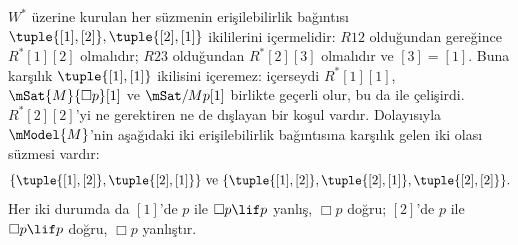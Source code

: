 \begin{ex}
  $W^*$ üzerine kurulan her süzmenin erişilebilirlik bağıntısı
  $\tuple{[1], [2]}, \tuple{[2],[1]}$ ikililerini içermelidir:
  $R12$ olduğundan
   gereğince
  $R^*[1][2]$ olmalıdır; $R23$ olduğundan $R^*[2][3]$ olmalıdır ve
  $[3]=[1]$. Buna karşılık $\tuple{[1],[1]}$ ikilisini içeremez: içerseydi
  $R^*[1][1]$, $\mSat{M}{\Box p}[1]$ ve $\mSat/{M}{p}[1]$ birlikte
  geçerli olur, bu da  ile çelişirdi.
  $R^*[2][2]$'yi ne gerektiren ne de dışlayan bir koşul vardır. Dolayısıyla
  $\mModel{M}$'nin aşağıdaki iki erişilebilirlik bağıntısına karşılık gelen
  iki olası süzmesi vardır:
  \[
  \{\tuple{[1],[2]}, \tuple{[2],[1]}\} \text{ ve }
  \{\tuple{[1],[2]}, \tuple{[2],[1]}, \tuple{[2],[2]}\}.
  \]
  Her iki durumda da $[1]$'de $p$ ile $\Box p \lif p$ yanlış,
  $\Box p$ doğru; $[2]$'de $p$ ile $\Box p \lif p$ doğru,
  $\Box p$ yanlıştır.
\end{ex}


